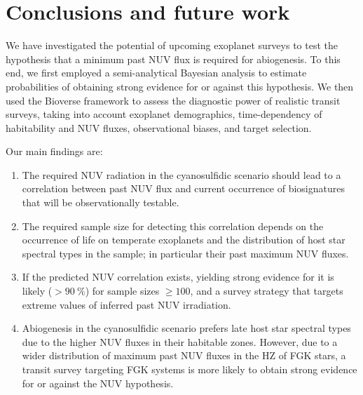 \documentclass[twocolumn,twocolappendix,linenumbers]{aastex631}
\begin{document}


\section{Conclusions and future work}
We have investigated the potential of upcoming exoplanet surveys to test the hypothesis that a minimum past \gls{NUV} flux is required for abiogenesis.
To this end, we first employed a semi-analytical Bayesian analysis to estimate probabilities of obtaining strong evidence for or against this hypothesis.
We then used the Bioverse framework to assess the diagnostic power of realistic transit surveys, taking into account exoplanet demographics, time-dependency of habitability and \gls{NUV} fluxes, observational biases, and target selection.

Our main findings are:
\begin{enumerate}
    \item The required \gls{NUV} radiation in the cyanosulfidic scenario should lead to a correlation between past \gls{NUV} flux and current occurrence of biosignatures that will be observationally testable.
    \item The required sample size for detecting this correlation depends on the occurrence of life on temperate exoplanets and the distribution of host star spectral types in the sample; in particular their past maximum \gls{NUV} fluxes.
    \item If the predicted \gls{NUV} correlation exists, yielding strong evidence for it is likely ($> \SI{90}{\percent}$) for sample sizes $\geq 100$, and a survey strategy that targets extreme values of inferred past \gls{NUV} irradiation.
    \item Abiogenesis in the cyanosulfidic scenario prefers late host star spectral types due to the higher \gls{NUV} fluxes in their habitable zones. However, due to a wider distribution of maximum past \gls{NUV} fluxes in the \gls{HZ} of FGK stars, a transit survey targeting FGK systems is more likely to obtain strong evidence for or against the \gls{NUV} hypothesis.

\end{enumerate}
\end{document}
